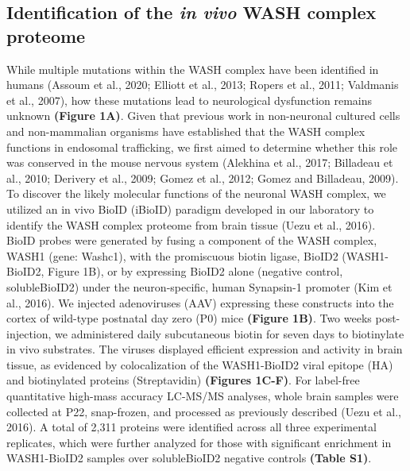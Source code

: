 
\subsection{Identification of the \textit{in vivo} WASH complex proteome}

While multiple mutations within the WASH complex have been identified in humans 
(Assoum et al., 2020; Elliott et al., 2013; Ropers et al., 2011; 
Valdmanis et al., 2007), how these mutations lead to neurological
dysfunction remains unknown \textbf{(Figure 1A)}. Given that previous work in
non-neuronal cultured cells and non-mammalian organisms have established that
the WASH complex functions in endosomal trafficking, we first aimed to determine
whether this role was conserved in the mouse nervous system (Alekhina et al.,
2017; Billadeau et al., 2010; Derivery et al., 2009; Gomez et al., 2012; Gomez
and Billadeau, 2009). To discover the likely molecular functions of the neuronal
WASH complex, we utilized an in vivo BioID (iBioID) paradigm developed in our
laboratory to identify the WASH complex proteome from brain tissue (Uezu et al.,
2016). BioID probes were generated by fusing a component of the WASH complex,
WASH1 (gene: Washc1), with the promiscuous biotin ligase, BioID2 (WASH1-BioID2,
Figure 1B), or by expressing BioID2 alone (negative control, solubleBioID2)
under the neuron-specific, human Synapsin-1 promoter (Kim et al., 2016). We
injected adenoviruses (AAV) expressing these constructs into the cortex of
wild-type postnatal day zero (P0) mice \textbf{(Figure 1B)}. Two weeks post-injection, we
administered daily subcutaneous biotin for seven days to biotinylate in vivo
substrates. The viruses displayed efficient expression and activity in brain
tissue, as evidenced by colocalization of the WASH1-BioID2 viral epitope (HA)
and biotinylated proteins (Streptavidin) \textbf{(Figures 1C-F)}. For label-free
quantitative high-mass accuracy LC-MS/MS analyses, whole brain samples were
collected at P22, snap-frozen, and processed as previously described (Uezu et
al., 2016). A total of 2,311 proteins were identified across all three
experimental replicates, which were further analyzed for those with significant
enrichment in WASH1-BioID2 samples over solubleBioID2 negative controls 
\textbf{(Table S1)}. 

